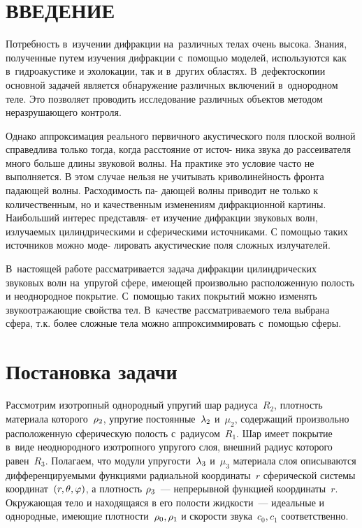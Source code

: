 

\renewcommand{\bibname}{СПИСОК ИСПОЛЬЗОВАННЫХ ИСТОЧНИКОВ}
\renewcommand\refname{СПИСОК ИСПОЛЬЗОВАННЫХ ИСТОЧНИКОВ}

%

\setcounter{page}{2}
\thispagestyle {empty}
\renewcommand{\contentsname}{\centering СОДЕРЖАНИЕ}
\tableofcontents

\newpage
\section*{ВВЕДЕНИЕ}
Потребность в~изучении дифракции на~различных телах очень высока. Знания, полученные путем изучения дифракции с~помощью моделей, используются как в~гидроакустике и эхолокации, так и в~других областях. В~дефектоскопии основной задачей является обнаружение различных включений в~однородном теле. Это позволяет проводить исследование различных объектов методом неразрушающего контроля.


Однако аппроксимация реального первичного акустического поля
плоской волной справедлива только тогда, когда расстояние от источ-
ника звука до рассеивателя много больше длины звуковой волны. На
практике это условие часто не выполняется. В этом случае нельзя не
учитывать криволинейность фронта падающей волны. Расходимость па-
дающей волны приводит не только к количественным, но и качественным
изменениям дифракционной картины. Наибольший интерес представля-
ет изучение дифракции звуковых волн, излучаемых цилиндрическими и
сферическими источниками. С помощью таких источников можно моде-
лировать акустические поля сложных излучателей.


В~настоящей работе рассматривается задача дифракции цилиндрических звуковых волн на~упругой сфере, имеющей произвольно расположенную полость и неоднородное покрытие. С~помощью таких покрытий можно изменять звукоотражающие свойства тел. В~качестве рассматриваемого тела выбрана сфера, т.к. более сложные тела можно аппроксиммировать с~помощью сферы. 


\newpage
\section{Постановка задачи} Рассмотрим изотропный однородный упругий шар радиуса~$R_2$, плотность материала которого~$\rho_2$, упругие постоянные~$\lambda_2$ и~$\mu_2$, содержащий произвольно расположенную сферическую полость с~радиусом~$R_1$. Шар имеет покрытие в~виде неоднородного изотропного упругого слоя, внешний радиус которого равен~$R_3$. Полагаем, что модули упругости~$\lambda_3$ и~$\mu_3$ материала слоя описываются дифференцируемыми функциями радиальной координаты~$r$ сферической системы координат~$(r, \theta, \varphi)$, а плотность $\rho_3$~--- непрерывной функцией координаты~$r$.  Окружающая тело и находящаяся в его полости жидкости~--- идеальные и однородные, имеющие плотности~$\rho_0, \rho_1$ и скорости звука~$c_0, c_1$ соответственно. 

